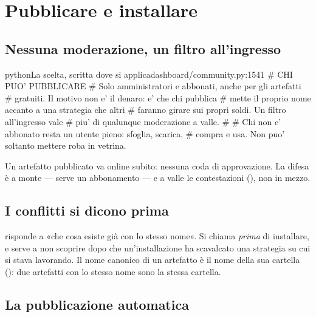\section{Pubblicare e installare}\label{sez:pubblicare}

\subsection{Nessuna moderazione, un filtro all'ingresso}

\begin{codiceInterno}{python}{La scelta, scritta dove si applica}{dashboard/community.py:1541}
        # CHI PUO' PUBBLICARE
        # Solo amministratori e abbonati, anche per gli artefatti
        # gratuiti. Il motivo non e' il denaro: e' che chi pubblica
        # mette il proprio nome accanto a una strategia che altri
        # faranno girare sui propri soldi. Un filtro all'ingresso vale
        # piu' di qualunque moderazione a valle.
        #
        # Chi non e' abbonato resta un utente pieno: sfoglia, scarica,
        # compra e usa. Non puo' soltanto mettere roba in vetrina.
\end{codiceInterno}

\noindent
Un artefatto pubblicato va online subito: nessuna coda di approvazione. La
difesa è a monte --- serve un abbonamento --- e a valle le contestazioni
(), non in mezzo.

\subsection{I conflitti si dicono prima}

 risponde a «che cosa esiste già con
lo stesso nome». Si chiama \emph{prima} di installare, e serve a non scoprire
dopo che un'installazione ha scavalcato una strategia su cui si stava
lavorando. Il nome canonico di un artefatto è il nome della sua cartella
(): due artefatti con lo stesso nome sono la stessa
cartella.

\subsection{La pubblicazione automatica}

